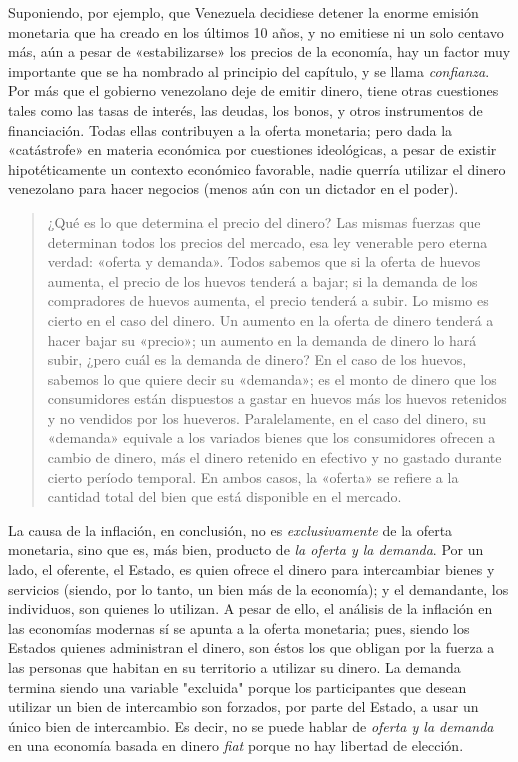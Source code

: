 \documentclass[12pt,a4paper,twoside]{book}
\begin{document}
Suponiendo, por ejemplo, que Venezuela decidiese detener la enorme emisión monetaria que ha creado en los últimos 10 años, y no emitiese ni un solo centavo más, aún a pesar de «estabilizarse» los precios de la economía, hay un factor muy importante que se ha nombrado al principio del capítulo, y se llama \textit{confianza}. Por más que el gobierno venezolano deje de emitir dinero, tiene otras cuestiones tales como las tasas de interés, las deudas, los bonos, y otros instrumentos de financiación. Todas ellas contribuyen a la oferta monetaria; pero dada la «catástrofe» en materia económica por cuestiones ideológicas, a pesar de existir hipotéticamente un contexto económico favorable, nadie querría utilizar el dinero venezolano para hacer negocios (menos aún con un dictador en el poder).

\begin{quotation}
¿Qué es lo que determina el precio del dinero? Las mismas fuerzas que determinan todos los precios del mercado, esa ley venerable pero eterna verdad: «oferta y demanda». Todos sabemos que si la oferta de huevos aumenta, el precio de los huevos tenderá a bajar; si la demanda de los compradores de huevos aumenta, el precio tenderá a subir. Lo mismo es cierto en el caso del dinero. Un aumento en la oferta de dinero tenderá a hacer bajar su «precio»; un aumento en la demanda de dinero lo hará subir, ¿pero cuál es la demanda de dinero? En el caso de los huevos, sabemos lo que quiere decir su «demanda»; es el monto de dinero que los consumidores están dispuestos a gastar en huevos más los huevos retenidos y no vendidos por los hueveros. Paralelamente, en el caso del dinero, su «demanda» equivale a los variados bienes que los consumidores ofrecen a cambio de dinero, más el dinero retenido en efectivo y no gastado durante cierto período temporal. En ambos casos, la «oferta» se refiere a la cantidad total del bien que está disponible en el mercado. \cite[págs. 22-23]{rothbard:dinero}
\end{quotation}

La causa de la inflación, en conclusión, no es \textit{exclusivamente} de la oferta monetaria, sino que es, más bien, producto de \textit{la oferta y la demanda}. Por un lado, el oferente, el Estado, es quien ofrece el dinero para intercambiar bienes y servicios (siendo, por lo tanto, un bien más de la economía); y el demandante, los individuos, son quienes lo utilizan. A pesar de ello, el análisis de la inflación en las economías modernas sí se apunta a la oferta monetaria; pues, siendo los Estados quienes administran el dinero, son éstos los que obligan por la fuerza a las personas que habitan en su territorio a utilizar su dinero. La demanda termina siendo una variable "excluida" porque los participantes que desean utilizar un bien de intercambio son forzados, por parte del Estado, a usar un único bien de intercambio. Es decir, no se puede hablar de \textit{oferta y la demanda} en una economía basada en dinero \textit{fiat} porque no hay libertad de elección.
\end{document}
